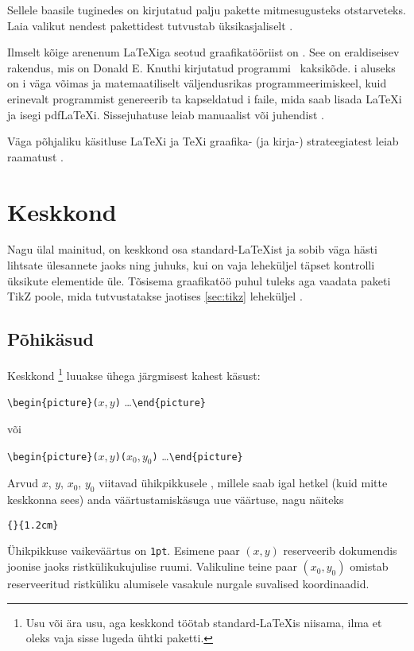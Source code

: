 Sellele baasile tuginedes on kirjutatud palju pakette mitmesugusteks
otstarveteks. Laia valikut nendest pakettidest tutvustab üksikasjaliselt
\graphicscompanion{}.

Ilmselt kõige arenenum \LaTeX iga seotud graafikatööriist on
\MP. See on eraldiseisev rakendus, mis on
Donald E. Knuthi kirjutatud programmi
\MF\ kaksikõde. \MP i aluseks on \MF i väga võimas
ja matemaatiliselt väljendusrikas programmeerimiskeel, kuid erinevalt
programmist \MF{} genereerib ta kapseldatud \PSi i faile, mida saab
lisada \LaTeX i ja isegi pdf\LaTeX i. Sissejuhatuse leiab manuaalist
\hobby{} või juhendist \cite{ursoswald}.

Väga põhjaliku käsitluse \LaTeX i ja \TeX i graafika- (ja kirja-)
strateegiatest leiab raamatust \hoenig.

\section{Keskkond }
Nagu ülal mainitud, on keskkond  osa standard-\LaTeX ist
ja sobib väga hästi lihtsate ülesannete jaoks ning juhuks, kui on vaja
leheküljel täpset kontrolli üksikute elementide üle. Tõsisema
graafikatöö puhul tuleks aga vaadata paketi TikZ poole, mida
tutvustatakse jaotises \ref{sec:tikz} leheküljel \pageref{sec:tikz}.

\subsection{Põhikäsud}

Keskkond \footnote{Usu või ära usu, aga keskkond
 töötab standard-\LaTeX is niisama, ilma et oleks vaja
sisse lugeda ühtki paketti.} luuakse ühega järgmisest kahest käsust:
\begin{lscommand}
\verb|\begin{picture}(|$x,y$\verb|)| \ldots\verb|\end{picture}|
\end{lscommand}
\noindent või
\begin{lscommand}
\verb|\begin{picture}(|$x,y$\verb|)(|$x_0,y_0$\verb|)| \ldots\verb|\end{picture}|
\end{lscommand}
\noindent Arvud $x$, $y$, $x_0$, $y_0$ viitavad ühikpikkusele
, millele saab igal hetkel (kuid mitte keskkonna
 sees) anda väärtustamiskäsuga uue väärtuse, nagu näiteks
\begin{lscommand}
\verb|{|\verb|}{1.2cm}|
\end{lscommand}
\noindent Ühikpikkuse  vaikeväärtus on \texttt{1pt}.
Esimene paar $(x,y)$ reserveerib dokumendis joonise jaoks
ristkülikukujulise ruumi. Valikuline teine paar $(x_0,y_0)$ omistab
reserveeritud ristküliku alumisele vasakule nurgale suvalised
koordinaadid.

